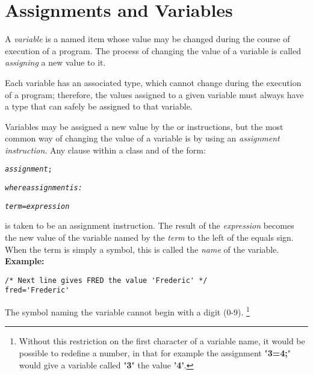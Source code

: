 \section{Assignments and Variables}\label{refassign}
\index{,}
 A \emph{variable} is a named item whose value may be changed
during the course of execution of a \nr{} program.
The process of changing the value of a variable is called
\emph{assigning} a new value to it.
 
Each variable has an associated type, which cannot change during the
execution of a program; therefore, the values assigned to a given
variable must always have a type that can safely be assigned to that
variable.

Variables may be assigned a new value by the  or
 instructions, but the most common way of changing the
value of a variable is by using an \emph{assignment instruction}.
Any clause within a class and of the form:
\begin{shaded}
\begin{alltt}
\emph{assignment};

\emph{where \emph{assignment} is:}

\emph{term}=\emph{expression}
\end{alltt}
\end{shaded}
is taken to be an assignment instruction.
The result of the \emph{expression} becomes the new value of the
variable named by the \emph{term} to the left of the equals sign.
When the term is simply a symbol, this is called the \emph{name} of
the variable.
 \textbf{Example:}
\begin{lstlisting}
/* Next line gives FRED the value 'Frederic' */
fred='Frederic'
\end{lstlisting}
The symbol naming the variable cannot begin with a digit (0-9).
\footnote{
Without this restriction on the first character of a variable name,
it would be possible to redefine a number, in that for example the
assignment "\textbf{3=4;}" would give a variable called
"\textbf{3}" the value \textbf{'4'}.
}
 
